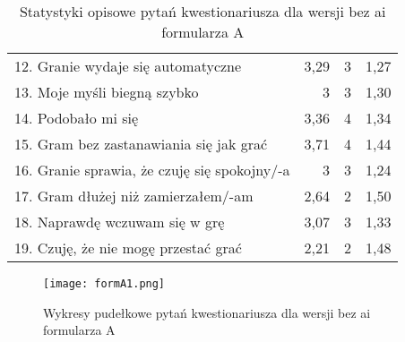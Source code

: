 \begin{table}[h!]
\begin{center}
\begin{tabular}{|m{12em}|r|r|r|}
            12. Granie wydaje się automatyczne                                & 3,29          & 3       & 1,27           \\
            13. Moje myśli \newline biegną szybko                             & 3             & 3       & 1,30           \\
            14. Podobało mi się                                               & 3,36          & 4       & 1,34           \\
            15. Gram bez zastanawiania się jak grać                           & 3,71          & 4       & 1,44           \\
            16. Granie sprawia, \newline że czuję się spokojny/-a             & 3             & 3       & 1,24           \\
            17. Gram dłużej \newline niż zamierzałem/-am                      & 2,64          & 2       & 1,50           \\
            18. Naprawdę wczuwam się w grę                                    & 3,07          & 3       & 1,33           \\
            19. Czuję, że nie mogę przestać grać                              & 2,21          & 2       & 1,48           \\
            \hline
        \end{tabular}
    \end{center}
    \caption{Statystyki opisowe pytań kwestionariusza dla wersji bez \gls{ai} formularza A}\label{tab1:appendixB_6}
\end{table}

\begin{figure}[h!]
    \centering
    \texttt{[image: formA1.png]}
    \caption{Wykresy pudełkowe pytań kwestionariusza dla wersji bez \gls{ai} formularza A}
    \label{fig:appendixB_formA1}
\end{figure}

